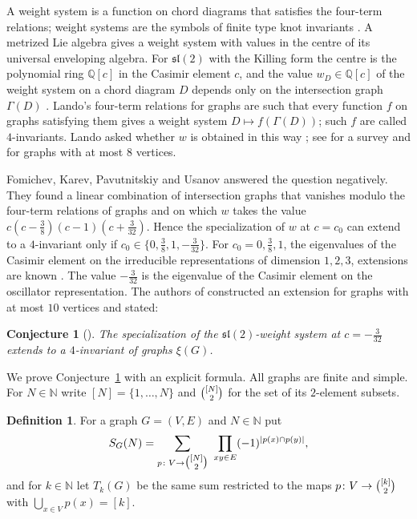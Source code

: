 \documentclass[preprint,12pt]{elsarticle}
\newtheorem{conjecture}[theorem]{Conjecture}
\theoremstyle{definition}
\newtheorem{definition}[theorem]{Definition}
\newcommand{\Q}{\mathbb{Q}}
\newcommand{\N}{\mathbb{N}}
\newcommand{\slt}{\mathfrak{sl}(2)}
\newcommand{\binomset}[2]{\tbinom{#1}{#2}}
\begin{document}
A weight system is a function on chord diagrams that satisfies the four-term relations; weight systems are the symbols of finite type knot invariants \cite{Kon93,BN95,CDM12}. A metrized Lie algebra gives a weight system with values in the centre of its universal enveloping algebra. For $\slt$ with the Killing form the centre is the polynomial ring $\Q[c]$ in the Casimir element $c$, and the value $w_D\in\Q[c]$ of the weight system on a chord diagram $D$ depends only on the intersection graph $\Gamma(D)$ \cite{ChL07}. Lando's four-term relations for graphs \cite{Lan00} are such that every function $f$ on graphs satisfying them gives a weight system $D\mapsto f(\Gamma(D))$; such $f$ are called $4$-invariants. Lando asked whether $w$ is obtained in this way \cite{ChL07}; see \cite{KL22} for a survey and \cite{Kra21} for graphs with at most $8$ vertices.

Fomichev, Karev, Pavutnitskiy and Usanov \cite{FKPU} answered the question negatively. They found a linear combination of intersection graphs that vanishes modulo the four-term relations of graphs and on which $w$ takes the value $c(c-\frac38)(c-1)(c+\frac{3}{32})$. Hence the specialization of $w$ at $c=c_0$ can extend to a $4$-invariant only if $c_0\in\{0,\frac38,1,-\frac{3}{32}\}$. For $c_0=0,\frac38,1$, the eigenvalues of the Casimir element on the irreducible representations of dimension $1,2,3$, extensions are known \cite{FKPU,FK25,YDJ26}. The value $-\frac{3}{32}$ is the eigenvalue of the Casimir element on the oscillator representation. The authors of \cite{FKPU} constructed an extension for graphs with at most $10$ vertices and stated:

\begin{conjecture}[{\cite[Section~4]{FKPU}}]\label{conj:fkpu}
The specialization of the $\slt$-weight system at $c=-\frac{3}{32}$ extends to a $4$-invariant of graphs $\xi(G)$.
\end{conjecture}

We prove Conjecture~\ref{conj:fkpu} with an explicit formula. All graphs are finite and simple. For $N\in\N$ write $[N]=\{1,\dots,N\}$ and $\binomset{[N]}{2}$ for the set of its $2$-element subsets.

\begin{definition}\label{def:S}
For a graph $G=(V,E)$ and $N\in\N$ put
\[
S_G(N)=\sum_{p\colon V\to\binomset{[N]}{2}}\ \prod_{xy\in E}(-1)^{|p(x)\cap p(y)|},
\]
and for $k\in\N$ let $T_k(G)$ be the same sum restricted to the maps $p\colon V\to\binomset{[k]}{2}$ with $\bigcup_{x\in V}p(x)=[k]$.
\end{definition}
\end{document}
